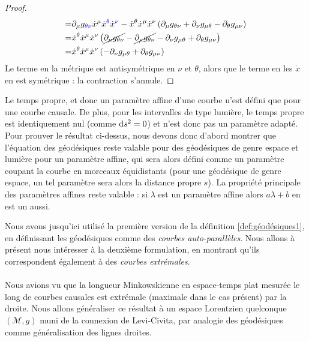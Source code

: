 \begin{proof}
\begin{align}
        =&\partial_{\mu}g_{\textcolor{blue}{\theta} \textcolor{blue}{\nu}}\dot{x}^{\mu}\dot{x}^{\textcolor{blue}{\theta}}\dot{x}^{\textcolor{blue}{\nu}} - \dot{x}^{\theta}\dot{x}^{\mu}\dot{x}^{\nu}\left(\partial_{\mu}g_{\theta\nu} + \partial_{\nu}g_{\mu \theta}-\partial_{\theta}g_{\mu \nu}\right)\\
        =&\dot{x}^{\theta}\dot{x}^{\mu}\dot{x}^{\nu}\left( \cancel{\partial_{\mu}g_{\theta\nu}} -\cancel{\partial_{\mu}g_{\theta\nu}} - \partial_{\nu}g_{\mu \theta}+\partial_{\theta}g_{\mu \nu} \right)\\
        =&\dot{x}^{\theta}\dot{x}^{\mu}\dot{x}^{\nu}\left( - \partial_{\nu}g_{\mu \theta}+\partial_{\theta}g_{\mu \nu} \right)\\
    \end{align}
    Le terme en la métrique est antisymétrique en $\nu$ et $\theta$, alors que le terme en les $\dot{x}$ en est symétrique : la contraction s'annule. 
\end{proof}
\begin{rmk}
    Le temps propre, et donc un paramètre affine d'une courbe n'est défini que pour une courbe causale. De plus, pour les intervalles de type lumière, le temps propre est identiquement nul (comme $\mathrm{d} s^2 = 0$) et n'est donc pas un paramètre adapté. Pour prouver le résultat ci-dessus, nous devons donc d'abord montrer que l'équation des géodésiques reste valable pour des géodésiques de genre espace et lumière pour un paramètre affine, qui sera alors défini comme un paramètre coupant la courbe en morceaux équidistants (pour une géodésique de genre espace, un tel paramètre sera alors la distance propre $s$). La propriété principale des paramètres affines reste valable : si $\lambda$ est un paramètre affine alors $a\lambda +b$ en est un aussi.
\end{rmk}
Nous avons jusqu'ici utilisé la première version de la définition \ref{def:géodésiques1}, en définissant les géodésiques comme des \emph{courbes auto-parallèles}. Nous allons à présent nous intéresser à la deuxième formulation, en montrant qu'ils correspondent également à des \emph{courbes extrémales}. \\
\\
Nous avions vu que la longueur Minkowskienne en espace-temps plat mesurée le long de courbes causales est extrémale (maximale dans le cas présent) par la droite. Nous allons généraliser ce résultat à un espace Lorentzien quelconque $(\mathcal{M},g)$ muni de la connexion de Levi-Civita, par analogie des géodésiques comme généralisation des lignes droites.

